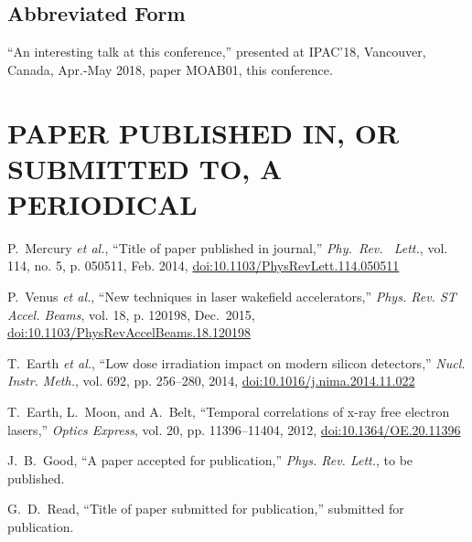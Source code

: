 \subsection{Abbreviated Form}

\begin{thebibliography}{9} %
\setcounter{enumi}{4}
	“An interesting talk at this conference,”
	presented at IPAC’18, Vancouver, Canada, Apr.-May 2018, 
	paper MOAB01, this conference.
\end{thebibliography}


\vspace*{-.5\baselineskip}
\section{PAPER PUBLISHED IN, OR SUBMITTED TO, A PERIODICAL}

\begin{thebibliography}{99} %
  \setcounter{enumi}{5}
		P.~Mercury \emph{et al.},
		“Title of paper published in journal,”
		\emph{Phy.~Rev.~	Lett.}, vol. 114, no. 5,
		p. 050511, Feb. 2014,
		\url{doi:10.1103/PhysRevLett.114.050511}

		P.~Venus \emph{et al.},
		“New techniques in laser wakefield accelerators,”
		\emph{Phys. Rev. ST Accel. Beams}, vol. 18,
		p. 120198, Dec.~2015, \newline
		\url{doi:10.1103/PhysRevAccelBeams.18.120198} 

		T.~Earth \emph{et al.},
		“Low dose irradiation impact on modern silicon detectors,”
		\emph{Nucl. Instr. Meth.}, vol. 692, pp. 256--280, 2014,
		\url{doi:10.1016/j.nima.2014.11.022}
	
		T.~Earth, L.~Moon, and A.~Belt,
		“Temporal correlations of x-ray free electron lasers,”
		\emph{Optics Express}, vol. 20, pp. 11396--11404, 2012,
		\url{doi:10.1364/OE.20.11396}

		J.~B.~Good,
		“A paper accepted for publication,”
		\emph{Phys. Rev. Lett.}, to be published.

		G.~D.~Read,
		“Title of paper submitted for publication,”
		submitted for publication.
\end{thebibliography}

